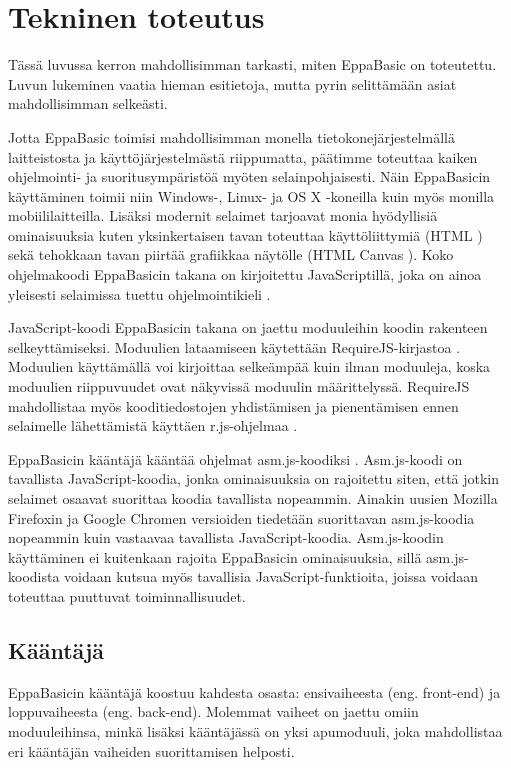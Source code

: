 
\section{Tekninen toteutus}

Tässä luvussa kerron mahdollisimman tarkasti,
miten EppaBasic on toteutettu.
Luvun lukeminen vaatia hieman esitietoja,
mutta pyrin selittämään asiat mahdollisimman selkeästi.

Jotta EppaBasic toimisi mahdollisimman monella
tietokonejärjestelmällä laitteistosta ja
käyttöjärjestelmästä riippumatta,
päätimme toteuttaa kaiken ohjelmointi-
ja suoritusympäristöä myöten
selainpohjaisesti.
Näin EppaBasicin käyttäminen toimii niin
Windows-, Linux- ja OS X -koneilla
kuin myös monilla mobiililaitteilla.
Lisäksi modernit selaimet tarjoavat
monia hyödyllisiä ominaisuuksia
kuten yksinkertaisen tavan toteuttaa
käyttöliittymiä (HTML \cite{w3c_html})
sekä tehokkaan tavan piirtää grafiikkaa
näytölle (HTML Canvas \cite{mdn_canvas}).
Koko ohjelmakoodi EppaBasicin takana
on kirjoitettu JavaScriptillä,
joka on ainoa yleisesti selaimissa
tuettu ohjelmointikieli \cite{mdn_about_js}.

JavaScript-koodi EppaBasicin takana
on jaettu moduuleihin koodin
rakenteen selkeyttämiseksi.
Moduulien lataamiseen käytettään
RequireJS-kirjastoa \cite{requirejs}.
Moduulien käyttämällä voi kirjoittaa
selkeämpää kuin ilman moduuleja,
koska moduulien riippuvuudet ovat
näkyvissä moduulin määrittelyssä.
RequireJS mahdollistaa myös kooditiedostojen
yhdistämisen ja pienentämisen ennen selaimelle
lähettämistä käyttäen r.js-ohjelmaa \cite{r.js}.

EppaBasicin kääntäjä kääntää ohjelmat
asm.js-koodiksi \cite{asm.js}.
Asm.js-koodi on tavallista
JavaScript-koodia, jonka
ominaisuuksia on rajoitettu siten,
että jotkin selaimet osaavat
suorittaa koodia tavallista
nopeammin.
Ainakin uusien Mozilla Firefoxin
ja Google Chromen versioiden
tiedetään suorittavan
asm.js-koodia nopeammin
kuin vastaavaa tavallista
JavaScript-koodia.
Asm.js-koodin käyttäminen
ei kuitenkaan rajoita
EppaBasicin ominaisuuksia,
sillä asm.js-koodista
voidaan kutsua myös
tavallisia JavaScript-funktioita,
joissa voidaan toteuttaa
puuttuvat toiminnallisuudet.


\subsection{Kääntäjä}
EppaBasicin kääntäjä koostuu kahdesta osasta:
ensivaiheesta (eng. front-end) ja
loppuvaiheesta (eng. back-end).
Molemmat vaiheet on jaettu omiin moduuleihinsa,
minkä lisäksi kääntäjässä on yksi apumoduuli,
joka mahdollistaa eri kääntäjän vaiheiden
suorittamisen helposti.


